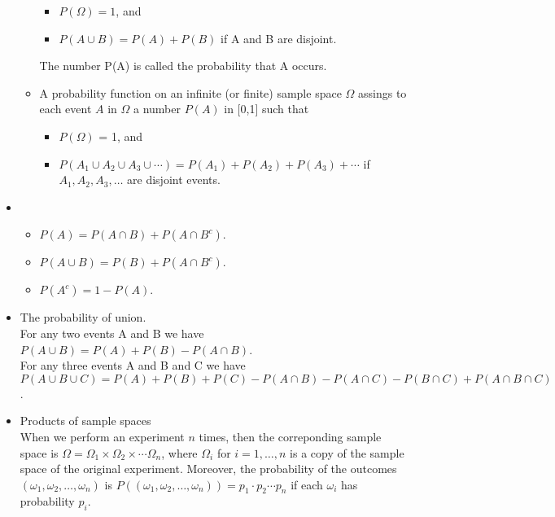 \documentclass{article} %
\begin{document}
\begin{itemize}
\begin{itemize}
\begin{itemize}
\item $P(\Omega) = 1$, and
\item $P(A\cup B) = P(A) + P(B)$ if A and B are disjoint. 
\end{itemize}
The number P(A) is called the probability that A occurs. 
\item A probability function on an infinite (or finite) sample space $\Omega$ assings to each event $A$ in $\Omega$ a number $P(A)$ in [0,1] such that
\begin{itemize}
\item $P(\Omega)$ = 1, and
\item $P\left(A_1 \cup A_2 \cup A_3 \cup \cdots \right) = P(A_1) + P(A_2) + P(A_3) + \cdots$ if $A_1, A_2, A_3, \ldots$ are disjoint events. 
\end{itemize}
\end{itemize}
\item
\begin{itemize}
\item $P(A) = P(A \cap B) + P(A \cap B^c)$.
\item $P(A \cup B) = P(B) + P(A \cap B^c)$. 
\item $P(A^c) = 1 - P(A)$.
\end{itemize}
\item The probability of union.\\
For any two events A and B we have \\$P(A \cup B) = P(A) + P(B) - P(A \cap B)$. \\
For any three events A and B and C we have \\$P(A \cup B \cup C) = P(A) + P(B) + P(C) - P(A \cap B) - P(A \cap C) - P(B \cap C) + P(A \cap B \cap C)$.
\item Products of sample spaces\\
When we perform an experiment $n$ times, then the correponding sample space is $\Omega = \Omega_1 \times \Omega_2 \times \cdots \Omega_n$, where $\Omega_i$ for $i=1, \ldots, n$ is a copy of the sample space of the original experiment. Moreover, the probability of the outcomes $(\omega_1, \omega_2, \ldots, \omega_n)$ is $P\left((\omega_1, \omega_2, \ldots, \omega_n)\right) = p_1 \cdot p_2 \cdots p_n$ if each $\omega_i$ has probability $p_i$.  
\end{itemize}
\end{document}
